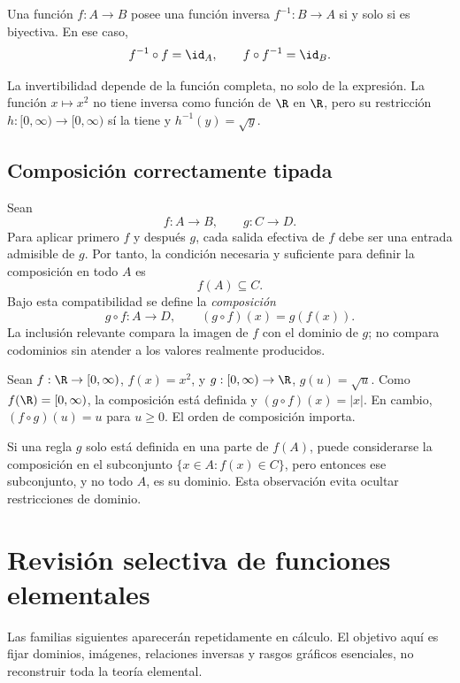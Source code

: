 \begin{proposicion}
Una función \(f:A\to B\) posee una función inversa
\(f^{-1}:B\to A\) si y solo si es biyectiva. En ese caso,
\[
  f^{-1}\circ f=\id_A,
  \qquad
  f\circ f^{-1}=\id_B.
\]
\end{proposicion}

La invertibilidad depende de la función completa, no solo de la expresión. La
función \(x\mapsto x^2\) no tiene inversa como función de \(\R\) en \(\R\),
pero su restricción \(h:[0,\infty)\to[0,\infty)\) sí la tiene y
\(h^{-1}(y)=\sqrt y\).

\subsection{Composición correctamente tipada}

Sean
\[
  f:A\to B, \qquad g:C\to D.
\]
Para aplicar primero \(f\) y después \(g\), cada salida efectiva de \(f\) debe
ser una entrada admisible de \(g\). Por tanto, la condición necesaria y
suficiente para definir la composición en todo \(A\) es
\[
  f(A)\subseteq C.
\]
Bajo esta compatibilidad se define la \emph{composición}
\[
  g\circ f:A\to D, \qquad (g\circ f)(x)=g(f(x)).
\]
La inclusión relevante compara la imagen de \(f\) con el dominio de \(g\); no
compara codominios sin atender a los valores realmente producidos.

\begin{ejemplo}
Sean \(f:\R\to[0,\infty)\), \(f(x)=x^2\), y
\(g:[0,\infty)\to\R\), \(g(u)=\sqrt u\). Como
\(f(\R)=[0,\infty)\), la composición está definida y
\((g\circ f)(x)=|x|\). En cambio,
\((f\circ g)(u)=u\) para \(u\ge0\). El orden de composición importa.
\end{ejemplo}

Si una regla \(g\) solo está definida en una parte de \(f(A)\), puede
considerarse la composición en el subconjunto
\(\{x\in A:f(x)\in C\}\), pero entonces ese subconjunto, y no todo \(A\), es
su dominio. Esta observación evita ocultar restricciones de dominio.

\section{Revisión selectiva de funciones elementales}
\label{sec:funciones-elementales}

Las familias siguientes aparecerán repetidamente en cálculo. El objetivo aquí
es fijar dominios, imágenes, relaciones inversas y rasgos gráficos esenciales,
no reconstruir toda la teoría elemental.

